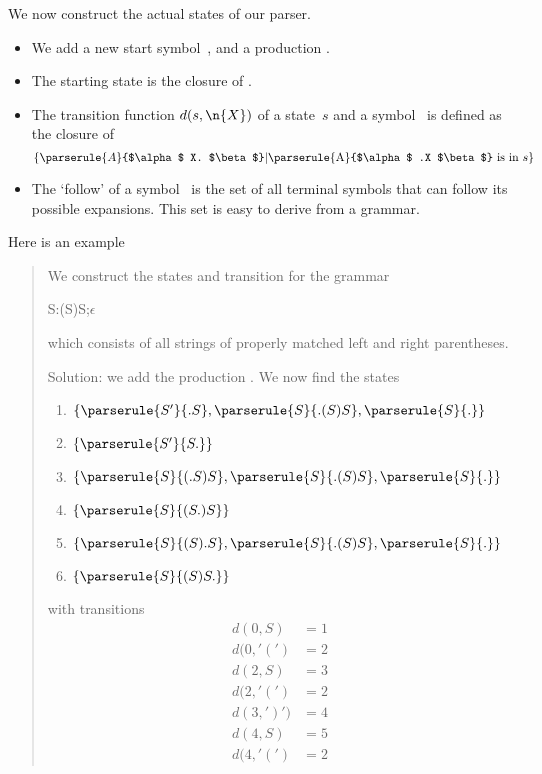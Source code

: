We now construct the actual states of our parser.
\begin{itemize}
\item We add a new start symbol~, and a production
  .
\item The starting state is the closure of .
\item The transition function $d(s,\n{X})$ of a state~$s$ and a
  symbol~ is defined as the closure of
\[ \{ \parserule{A}{$\alpha$ X. $\beta$}
          | \hbox{\parserule{A}{$\alpha$ .X $\beta$} is in $s$} \} \]
\item The `follow' of a symbol~ is the set of all
  terminal symbols that can follow its possible expansions. This set is
  easy to derive from a grammar.
\end{itemize}

Here is an example
\begin{quotation}
We construct the states and transition for the grammar
\begin{bnf}
S:(S)S;$\epsilon$
\end{bnf}
which consists of all strings of properly matched left and right parentheses.

Solution: we add the production . We now find the states
\begin{enumerate}
\item $\{ \parserule{S'}{.S}, \parserule{S}{.(S)S}, \parserule{S}{.} \}$ 
\item $\{ \parserule{S'}{S.} \}$ 
\item $\{ \parserule{S}{(.S)S}, \parserule{S}{.(S)S}, \parserule{S}{.} \}$ 
\item $\{ \parserule{S}{(S.)S} \}$ 
\item $\{ \parserule{S}{(S).S}, \parserule{S}{.(S)S}, \parserule{S}{.} \}$ 
\item $\{ \parserule{S}{(S)S.} \}$
\end{enumerate}
with transitions
\[ \begin{array}{ll}
d(0,S) &= 1 \\
d(0,'(') &= 2 \\
d(2,S) &= 3 \\
d(2,'(') &= 2 \\
d(3,')') &= 4 \\
d(4,S) &= 5 \\
d(4,'(') &= 2 
\end{array} \]
\end{quotation}

